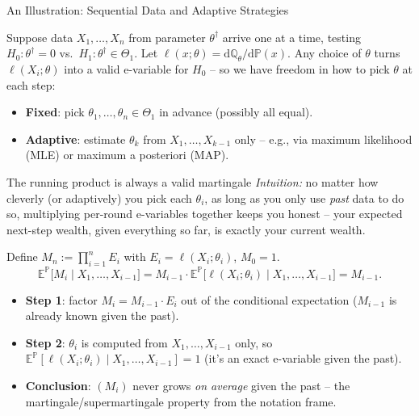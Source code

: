 \documentclass[aspectratio=169,10pt]{beamer}
\begin{document}
\begin{frame}[allowframebreaks]{An Illustration: Sequential Data and Adaptive Strategies}

Suppose data $X_1,\dots,X_n$ from parameter $\theta^{\dagger}$ arrive one
at a time, testing $H_0:\theta^{\dagger}=0$ vs.\ $H_1:\theta^{\dagger}\in\Theta_1$.
Let $\ell(x;\theta)=\mathrm{d}\mathbb{Q}_\theta/\mathrm{d}\mathbb{P}(x)$. Any
choice of $\theta$ turns $\ell(X_i;\theta)$ into a valid e-variable for
$H_0$ -- so we have freedom in how to pick $\theta$ at each step:
\begin{itemize}
  \item[(a)] \textbf{Fixed}: pick $\theta_1,\dots,\theta_n\in\Theta_1$ in
    advance (possibly all equal).
  \item[(b)] \textbf{Adaptive}: estimate $\theta_k$ from
    $X_1,\dots,X_{k-1}$ only -- e.g., via maximum likelihood (MLE) or
    maximum a posteriori (MAP).
\end{itemize}

\framebreak

\begin{block}{The running product is always a valid martingale}
\emph{Intuition:} no matter how cleverly (or adaptively) you pick each
$\theta_i$, as long as you only use \emph{past} data to do so, multiplying
per-round e-variables together keeps you honest -- your expected next-step
wealth, given everything so far, is exactly your current wealth.

Define $M_n := \prod_{i=1}^n E_i$ with $E_i=\ell(X_i;\theta_i)$, $M_0=1$.
\[
  \mathbb{E}^{\mathbb{P}}\!\big[M_i \mid X_1,\dots,X_{i-1}\big]
  = M_{i-1}\cdot\mathbb{E}^{\mathbb{P}}\!\big[\ell(X_i;\theta_i)\mid X_1,\dots,X_{i-1}\big]
  = M_{i-1}.
\]
\begin{itemize}
  \item \textbf{Step 1}: factor $M_i = M_{i-1}\cdot E_i$ out of the
    conditional expectation ($M_{i-1}$ is already known given the past).
  \item \textbf{Step 2}: $\theta_i$ is computed from
    $X_1,\dots,X_{i-1}$ only, so $\mathbb{E}^{\mathbb{P}}[\ell(X_i;\theta_i)\mid X_1,\dots,X_{i-1}]=1$
    (it's an exact e-variable given the past).
  \item \textbf{Conclusion}: $(M_i)$ never grows \emph{on average} given
    the past -- the martingale/supermartingale property from the notation
    frame.
\end{itemize}
\end{block}


\end{frame}
\end{document}
